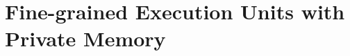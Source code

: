 \newcommand{\shreds}{\textsc{Shreds}\xspace}
\section{Fine-grained Execution Units with Private Memory}








